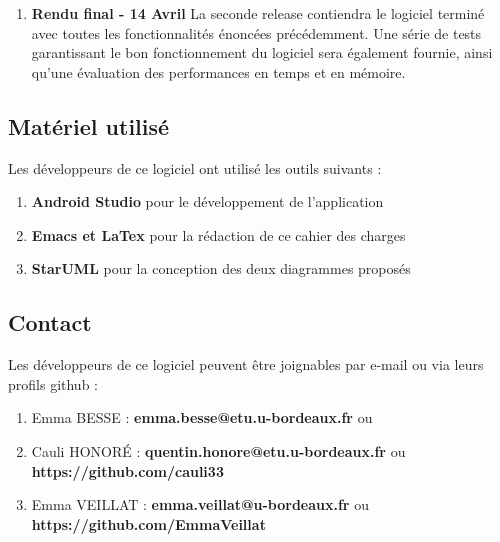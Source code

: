 \documentclass{article}
\begin{document}
\label{dateMAJ}
\begin{enumerate}
\setcounter{enumi}{\thenumeroM}

\item{\bf Rendu final - 14 Avril}
La seconde release contiendra le logiciel terminé avec toutes les
fonctionnalités énoncées précédemment. Une
série de tests garantissant le bon fonctionnement du logiciel sera également fournie, ainsi
qu'une évaluation des performances en temps et en mémoire.
\end{enumerate}

\subsection{Matériel utilisé}

Les développeurs de ce logiciel ont utilisé les outils suivants :
\begin{enumerate}
\item {\bf Android Studio} pour le développement de l'application
\item {\bf Emacs et LaTex} pour la rédaction de ce cahier des charges
\item {\bf StarUML} pour la conception des deux diagrammes proposés 
\end{enumerate}

\subsection{Contact}

Les développeurs de ce logiciel peuvent être joignables par e-mail ou via leurs profils github :
\begin{enumerate}
\item Emma BESSE : {\bf emma.besse@etu.u-bordeaux.fr} ou 
\item Cauli HONORÉ : {\bf quentin.honore@etu.u-bordeaux.fr} ou {\bf https://github.com/cauli33}
\item Emma VEILLAT : {\bf emma.veillat@u-bordeaux.fr} ou {\bf https://github.com/EmmaVeillat}
\end{enumerate}
\end{document}
